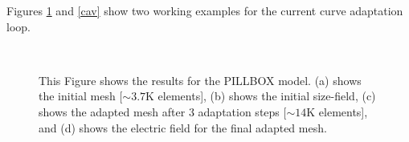 \documentclass[review,12pt]{elsarticle_summary_report}
\begin{document}
Figures \ref{pill} and \ref{cav} show two working examples for the current curve adaptation loop.
\begin{landscape}
\begin{figure}[ph!]
\centering
{}
\hspace*{50pt}
\\
\hspace*{50pt}
\caption{\label{pill} This Figure shows the results for the PILLBOX model. (a) shows the initial mesh [$\sim3.7\text{K}$ elements], (b) shows the initial size-field, (c) shows the adapted mesh after 3 adaptation steps [$\sim14\text{K}$ elements], and (d) shows the electric field for the final adapted mesh.}
\end{figure}
\end{landscape}
\end{document}
